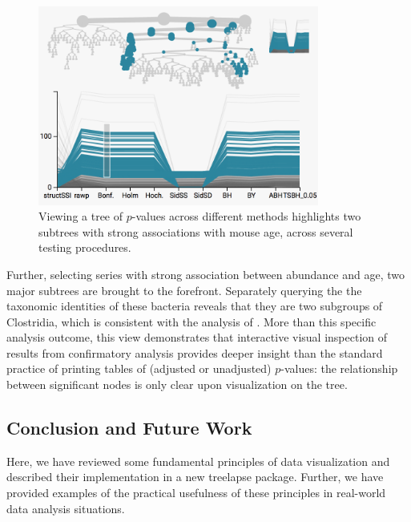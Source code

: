 \documentclass[12pt]{article}
\begin{document}
\begin{figure}

{\centering \includegraphics[width=350px]{figure/structssi} 

}

\caption{Viewing a tree of $p$-values across different methods highlights two subtrees with strong associations with mouse age, across several testing procedures.}\label{fig:structssi}
\end{figure}

Further, selecting series with strong association between abundance and
age, two major subtrees are brought to the forefront. Separately
querying the the taxonomic identities of these bacteria reveals that they are
two subgroups of Clostridia, which is consistent with the analysis of
\citep{callahan2016bioconductor}. More than this specific analysis outcome, this
view demonstrates that interactive visual inspection of results from
confirmatory analysis provides deeper insight than the standard practice of
printing tables of (adjusted or unadjusted) $p$-values: the relationship between
significant nodes is only clear upon visualization on the tree.

\subsection*{Conclusion and Future Work}\label{conclusion}

Here, we have reviewed some fundamental principles of data visualization
and described their implementation in a new treelapse package. Further,
we have provided examples of the practical usefulness of these
principles in real-world data analysis situations.
\end{document}

